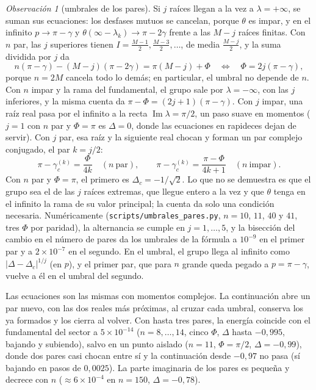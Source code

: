 \documentclass[11pt,a4paper]{article}
\theoremstyle{remark}
\newtheorem*{observacion}{Observación}
\begin{document}
\begin{observacion}[umbrales de los pares]\label{obs:umbrales}
Si $j$ raíces llegan a la vez a $\lambda=+\infty$, se suman sus ecuaciones: los desfases mutuos se
cancelan, porque $\theta$ es impar, y en el infinito $p\to\pi-\gamma$ y
$\theta(\infty-\lambda_k)\to\pi-2\gamma$ frente a las $M-j$ raíces finitas. Con $n$ par, las $j$
superiores tienen $I=\tfrac{M-1}2,\tfrac{M-3}2,\dots$, de media $\tfrac{M-j}2$, y la suma dividida
por $j$ da
\[
  n(\pi-\gamma)-(M-j)(\pi-2\gamma)=\pi(M-j)+\Phi
  \quad\Longleftrightarrow\quad \Phi=2j(\pi-\gamma),
\]
porque $n=2M$ cancela todo lo demás; en particular, el umbral no depende de $n$. Con $n$ impar y la
rama del fundamental, el grupo sale por $\lambda=-\infty$, con las $j$ inferiores, y la misma cuenta
da $\pi-\Phi=(2j+1)(\pi-\gamma)$. Con $j$ impar, una raíz real pasa por el infinito a la recta
$\operatorname{Im}\lambda=\pi/2$, un paso suave en momentos ($j=1$ con $n$ par y $\Phi=\pi$ es
$\Delta=0$, donde las ecuaciones en rapideces dejan de servir). Con $j$ par, esa raíz y la siguiente
real chocan y forman un par complejo conjugado, el par $k=j/2$:
\[
  \pi-\gamma_c^{(k)}=\frac{\Phi}{4k}\quad(n\ \text{par}),\qquad
  \pi-\gamma_c^{(k)}=\frac{\pi-\Phi}{4k+1}\quad(n\ \text{impar}).
\]
Con $n$ par y $\Phi=\pi$, el primero es $\Delta_c=-1/\sqrt2$. Lo que no se demuestra es que el grupo
sea el de las $j$ raíces extremas, que llegue entero a la vez y que $\theta$ tenga en el infinito
la rama de su valor principal; la cuenta da solo una condición necesaria. Numéricamente
(\texttt{scripts/umbrales\_pares.py}, $n=10$, $11$, $40$ y $41$, tres $\Phi$ por paridad), la
alternancia se cumple en $j=1,\dots,5$, y la bisección del cambio en el número de pares da los
umbrales de la fórmula a $10^{-9}$ en el primer par y a $2\times10^{-7}$ en el segundo. En el
umbral, el grupo llega al infinito como $|\Delta-\Delta_c|^{1/j}$ (en $p$), y el primer par, que
para $n$ grande queda pegado a $p=\pi-\gamma$, vuelve a él en el umbral del segundo.
\end{observacion}

Las ecuaciones son las mismas con momentos complejos. La continuación abre un par nuevo, con las
dos reales más próximas, al cruzar cada umbral, conserva los ya formados y los cierra al volver.
Con hasta tres pares, la energía coincide con el fundamental del sector a $5\times10^{-14}$
($n=8,\dots,14$, cinco $\Phi$, $\Delta$ hasta $-0{,}995$, bajando y subiendo), salvo en un punto
aislado ($n=11$, $\Phi=\pi/2$, $\Delta=-0{,}99$), donde dos pares casi chocan entre sí y la
continuación desde $-0{,}97$ no pasa (sí bajando en pasos de $0{,}0025$). La parte imaginaria de
los pares es pequeña y decrece con $n$ ($\approx6\times10^{-4}$ en $n=150$, $\Delta=-0{,}78$).
\end{document}
